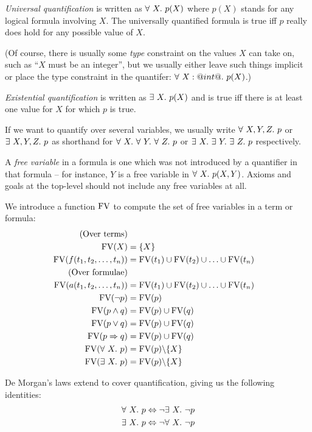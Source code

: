 \emph{Universal quantification} is written as $\forall\ X.\ p(X)$ where
$p(X)$ stands for any logical formula involving $X$.  The universally
quantified formula is true iff $p$ really does hold for any possible
value of $X$.

(Of course, there is usually some \emph{type} constraint on the values
$X$ can take on, such as ``$X$ must be an integer'', but we usually
either leave such things implicit or place the type constraint in the
quantifer: $\forall\ X:@int@.\ p(X)$.)

\emph{Existential quantification} is written as $\exists\ X.\ p(X)$ and is
true iff there is at least one value for $X$ for which $p$ is true.

If we want to quantify over several variables, we usually write
$\forall\ X, Y, Z.\ p$ or $\exists\ X, Y, Z.\ p$ as shorthand
for
$\forall\ X.\ \forall\ Y.\ \forall\ Z.\ p$ or
$\exists\ X.\ \exists\ Y.\ \exists\ Z.\ p$ respectively.

A \emph{free variable} in a formula is one which was not introduced by a
quantifier in that formula -- for instance, $Y$ is a free variable in
$\forall\ X.\ p(X, Y)$.  Axioms and goals at the top-level should not
include any free variables at all.

We introduce a function $\text{FV}$ to compute the set of free variables in a
term or formula:
\begin{align*}
\text{(Over terms)} \\
\text{FV}(X)
& = \{X\} \\
\text{FV}(f(t_1, t_2, \ldots, t_n))
& = \text{FV}(t_1) \cup \text{FV}(t_2) \cup \ldots \cup \text{FV}(t_n) \\
\text{(Over formulae)} \\
\text{FV}(a(t_1, t_2, \ldots, t_n))
& = \text{FV}(t_1) \cup \text{FV}(t_2) \cup \ldots \cup \text{FV}(t_n) \\
\text{FV}(\neg{}p)
& = \text{FV}(p) \\
\text{FV}(p \wedge q)
& = \text{FV}(p) \cup \text{FV}(q) \\
\text{FV}(p \vee q)
& = \text{FV}(p) \cup \text{FV}(q) \\
\text{FV}(p \Rightarrow q)
& = \text{FV}(p) \cup \text{FV}(q) \\
\text{FV}(\forall\ X.\ p)
& = \text{FV}(p) \backslash \{X\} \\
\text{FV}(\exists\ X.\ p)
& = \text{FV}(p) \backslash \{X\} \\
\end{align*}

De Morgan's laws extend to cover quantification, giving us the following
identities:
\begin{align*}
\forall\ X.\ p
& \Leftrightarrow \neg{}\exists\ X.\ \neg{}p \\
\exists\ X.\ p
& \Leftrightarrow \neg{}\forall\ X.\ \neg{}p \\
\end{align*}

